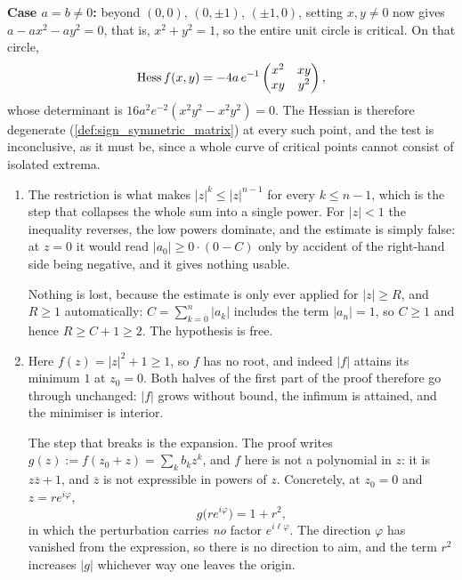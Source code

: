 \begin{exercisesolution}
\textbf{Case $a=b\neq0$:} beyond $(0,0)$, $(0,\pm1)$, $(\pm1,0)$, setting $x,y\neq0$ now gives
$a-ax^2-ay^2=0$, that is, $x^2+y^2=1$, so the entire unit circle is critical. On that circle,
\[\operatorname{Hess} f(x,y) = -4a\,e^{-1}\begin{pmatrix} x^2 & xy \\ xy & y^2 \end{pmatrix},\]
whose determinant is $16a^2e^{-2}(x^2y^2 - x^2y^2) = 0$. The Hessian is therefore degenerate
(\cref{def:sign_symmetric_matrix}) at every such point, and the test is inconclusive, as it must
be, since a whole curve of critical points cannot consist of isolated extrema.
\end{exercisesolution}

\begin{exercisesolution}
\label{sol:ai_fta_hypotheses}
\begin{enumerate}[label=\textbf{(\alph*)}]
  \item The restriction is what makes $\lvert z\rvert^k \leq \lvert z\rvert^{n-1}$ for every
    $k \leq n-1$, which is the step that collapses the whole sum into a single power. For
    $\lvert z\rvert < 1$ the inequality reverses, the low powers dominate, and the estimate is
    simply false: at $z = 0$ it would read $\lvert a_0\rvert \geq 0 \cdot (0 - C)$ only by
    accident of the right-hand side being negative, and it gives nothing usable.

    Nothing is lost, because the estimate is only ever applied for $\lvert z\rvert \geq R$, and
    $R \geq 1$ automatically: $C = \sum_{k=0}^n\lvert a_k\rvert$ includes the term
    $\lvert a_n\rvert = 1$, so $C \geq 1$ and hence $R \geq C+1 \geq 2$. The hypothesis is free.
  \item Here $f(z) = \lvert z\rvert^2+1 \geq 1$, so $f$ has no root, and indeed
    $\lvert f\rvert$ attains its minimum $1$ at $z_0 = 0$. Both halves of the first part of the
    proof therefore go through unchanged: $\lvert f\rvert$ grows without bound, the infimum is
    attained, and the minimiser is interior.

    The step that breaks is the expansion. The proof writes $g(z) := f(z_0+z) = \sum_k b_kz^k$,
    and $f$ here is not a polynomial in $z$: it is $z\overline z + 1$, and $\overline z$ is not
    expressible in powers of $z$. Concretely, at $z_0 = 0$ and $z = re^{i\varphi}$,
    \[g\big(re^{i\varphi}\big) = 1 + r^2,\]
    in which the perturbation carries \emph{no} factor $e^{i\ell\varphi}$. The direction
    $\varphi$ has vanished from the expression, so there is no direction to aim, and the term
    $r^2$ increases $\lvert g\rvert$ whichever way one leaves the origin.


\end{enumerate}
\end{exercisesolution}
